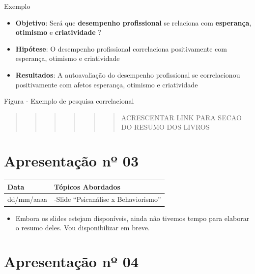 \documentclass[
]{book}
\providecommand{\tightlist}{%
  \setlength{\itemsep}{0pt}\setlength{\parskip}{0pt}}
\begin{document}
Exemplo

\begin{itemize}
\tightlist
\item
  \textbf{Objetivo}: Será que \textbf{desempenho profissional} se relaciona com \textbf{esperança}, \textbf{otimismo} e \textbf{criatividade} ?
\item
  \textbf{Hipótese}: O desempenho profissional correlaciona positivamente com esperança, otimismo e criatividade
\item
  \textbf{Resultados}: A autoavaliação do desempenho profissional se correlacionou positivamente com afetos esperança, otimismo e criatividade
\end{itemize}

Figura - Exemplo de pesquisa correlacional

\begin{quote}
\begin{quote}
\begin{quote}
\begin{quote}
\begin{quote}
\begin{quote}
ACRESCENTAR LINK PARA SECAO DO RESUMO DOS LIVROS
\end{quote}
\end{quote}
\end{quote}
\end{quote}
\end{quote}
\end{quote}

\hypertarget{apresentauxe7uxe3o-nuxba-03-1}{%
\section{Apresentação nº 03}\label{apresentauxe7uxe3o-nuxba-03-1}}

\begin{longtable}[]{@{}ll@{}}
\toprule()
Data & Tópicos Abordados \\
\midrule()
\endhead
dd/mm/aaaa & -Slide ``Psicanálise x Behaviorismo'' \\
\bottomrule()
\end{longtable}

\begin{itemize}
\tightlist
\item
  Embora os slides estejam disponíveis, ainda não tivemos tempo para elaborar o resumo deles. Vou disponibilizar em breve.
\end{itemize}

\hypertarget{apresentauxe7uxe3o-nuxba-04-1}{%
\section{Apresentação nº 04}\label{apresentauxe7uxe3o-nuxba-04-1}}
\end{document}
